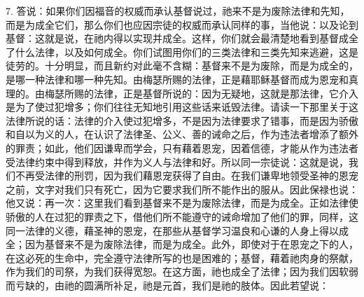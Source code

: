 7. 答说：如果你们因福音的权威而承认基督说过，祂来不是为废除法律和先知，而是为成全它们，那么你们也应因宗徒的权威而承认同样的事，当他说：以及论到基督：这就是说，在祂内得以实现并成全。这样，你们就会最清楚地看到基督成全了什么法律，以及如何成全。你们试图用你们的三类法律和三类先知来逃避，这是徒劳的。十分明显，而且新约对此毫不含糊：基督来不是为废除，而是为成全的，是哪一种法律和哪一种先知。由梅瑟所赐的法律，正是藉耶稣基督而成为恩宠和真理的。由梅瑟所赐的法律，正是基督所说的：因为无疑地，这就是那法律，它介入是为了使过犯增多；你们往往无知地引用这些话来诋毁法律。请读一下那里关于这法律所说的话：法律的介入使过犯增多，不是因为法律要求了错事，而是因为骄傲和自以为义的人，在认识了法律圣、公义、善的诫命之后，作为违法者增添了额外的罪责；如此，他们因谦卑而学会，只有藉着恩宠，因着信德，才能从作为违法者受法律约束中得到释放，并作为义人与法律和好。所以同一宗徒说：这就是说，我们不再受法律的刑罚，因为我们藉恩宠获得了自由。在我们谦卑地领受圣神的恩宠之前，文字对我们只有死亡，因为它要求我们所不能作出的服从。因此保禄也说：他又说：再一次：这里我们看到基督来不是为废除法律，而是为成全。正如法律使骄傲的人在过犯的罪责之下，借他们所不能遵守的诫命增加了他们的罪，同样，这同一法律的义德，藉圣神的恩宠，在那些从基督学习温良和心谦的人身上得以成全；因为基督来不是为废除法律，而是为成全。此外，即使对于在恩宠之下的人，在这必死的生命中，完全遵守法律所写的也是困难的；基督，藉着祂肉身的祭献，作为我们的司祭，为我们获得宽恕。在这方面，祂也成全了法律；因为我们因软弱而亏缺的，由祂的圆满所补足，祂是元首，我们是祂的肢体。因此若望说：\par

